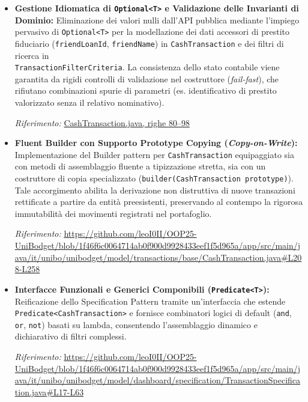 \documentclass[11pt,a4paper,openright]{report}
\begin{document}
\begin{itemize}[itemsep=5pt,topsep=3pt]
  \item \textbf{Gestione Idiomatica di \texttt{Optional<T>} e Validazione delle Invarianti di Dominio:} Eliminazione dei valori nulli dall'API pubblica mediante l'impiego pervasivo di \texttt{Optional<T>} per la modellazione dei dati accessori di prestito fiduciario (\texttt{friendLoanId}, \texttt{friendName}) in \texttt{CashTransaction} e dei filtri di ricerca in \\ \texttt{TransactionFilterCriteria}. La consistenza dello stato contabile viene garantita da rigidi controlli di validazione nel costruttore (\emph{fail-fast}), che rifiutano combinazioni spurie di parametri (es. identificativo di prestito valorizzato senza il relativo nominativo).
  \par\emph{Riferimento:}
    \href{https://github.com/leoI0II/OOP25-UniBodget/blob/1f46f6c0064714ab0f900d9928433eef1f5d965a/app/src/main/java/it/unibo/unibodget/model/transactions/base/CashTransaction.java\#L80-L98}{CashTransaction.java, righe 80--98}

  \item \textbf{Fluent Builder con Supporto Prototype Copying (\emph{Copy-on-Write}):} Implementazione del Builder pattern per \texttt{CashTransaction} equipaggiato sia con metodi di assemblaggio fluente a tipizzazione stretta, sia con un costruttore di copia specializzato (\texttt{builder(CashTransaction prototype)}). Tale accorgimento abilita la derivazione non distruttiva di nuove transazioni rettificate a partire da entità preesistenti, preservando al contempo la rigorosa immutabilità dei movimenti registrati nel portafoglio.
  \par\emph{Riferimento:} \url{https://github.com/leoI0II/OOP25-UniBodget/blob/1f46f6c0064714ab0f900d9928433eef1f5d965a/app/src/main/java/it/unibo/unibodget/model/transactions/base/CashTransaction.java#L208-L258}

  \item \textbf{Interfacce Funzionali e Generici Componibili (\texttt{Predicate<T>}):} Reificazione dello Specification Pattern tramite un'interfaccia che estende \texttt{Predicate<CashTransaction>} e fornisce combinatori logici di default (\texttt{and}, \texttt{or}, \texttt{not}) basati su lambda, consentendo l'assemblaggio dinamico e dichiarativo di filtri complessi.
  \par\emph{Riferimento:} \url{https://github.com/leoI0II/OOP25-UniBodget/blob/1f46f6c0064714ab0f900d9928433eef1f5d965a/app/src/main/java/it/unibo/unibodget/model/dashboard/specification/TransactionSpecification.java#L17-L63}


\end{itemize}
\end{document}
